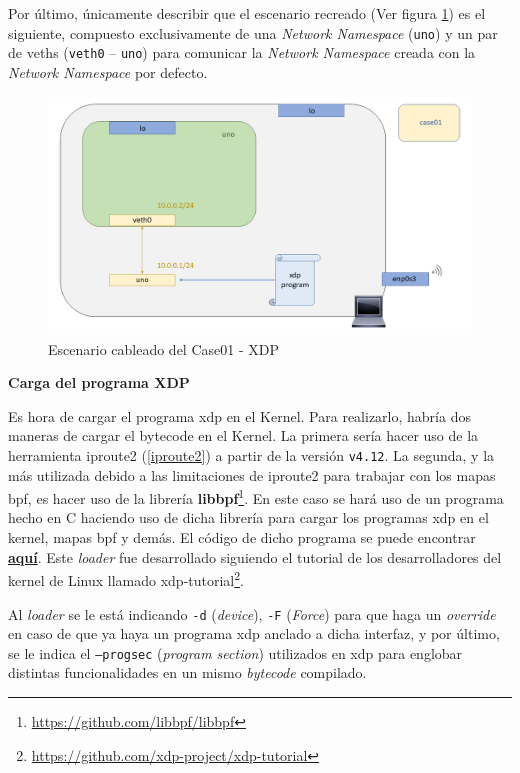Por último, únicamente describir que el escenario recreado (Ver figura \ref{fig:case01_xdp_ether_scenario}) es el siguiente, compuesto exclusivamente de una \textit{Network Namespace} (\texttt{uno}) y un par de \gls{veth}s (\texttt{veth0} -- \texttt{uno}) para comunicar la \textit{Network Namespace} creada con la \textit{Network Namespace} por defecto.


\begin{figure}[ht]
    \centering
    \includegraphics[width=16cm]{archivos/img/dev/xdp/case01/scenario.png}
    \caption{Escenario cableado del Case01 - XDP}
    \label{fig:case01_xdp_ether_scenario}
\end{figure}

\vspace{0.9cm}
\textbf{Carga del programa XDP}\\
\par

Es hora de cargar el programa \gls{xdp} en el Kernel. Para realizarlo, habría
dos maneras de cargar el bytecode en el Kernel. La primera sería hacer uso de la herramienta iproute2 (\ref{iproute2}) a partir de la versión \texttt{v4.12}. La segunda, y la más utilizada debido a las limitaciones de iproute2 para trabajar con los mapas \gls{bpf}, es hacer uso de la librería \textbf{libbpf}\footnote{\url{https://github.com/libbpf/libbpf}}. En este caso se hará uso de un programa hecho en C haciendo uso de dicha librería para cargar los programas \gls{xdp} en el kernel, mapas \gls{bpf} y demás. El código de dicho programa se puede encontrar \href{https://github.com/davidcawork/TFG/blob/master/src/use_cases/xdp/util/xdp_loader.c}{\textbf{aquí}}. Este \textit{loader} fue desarrollado siguiendo el tutorial de los desarrolladores del kernel de Linux llamado xdp-tutorial\footnote{\url{https://github.com/xdp-project/xdp-tutorial}}. \\
\par
Al \textit{loader} se le está indicando \texttt{-d} (\textit{device}), \texttt{-F} (\textit{Force}) para que haga un \textit{override} en caso de que ya haya un programa \gls{xdp} anclado a dicha interfaz, y por último, se le indica el \texttt{--progsec} (\textit{program section}) utilizados en \gls{xdp} para englobar distintas funcionalidades en un mismo \textit{bytecode} compilado. 

